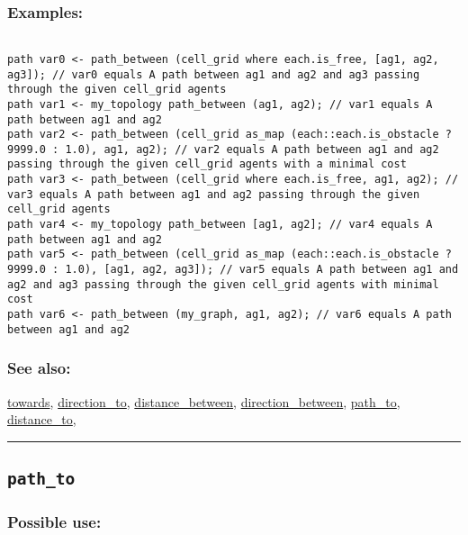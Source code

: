 \documentclass[]{book}
\theoremstyle{definition}
\theoremstyle{definition}
\theoremstyle{definition}
\theoremstyle{remark}
\begin{document}
\subsubsection{Examples:}\label{examples-271}

\begin{verbatim}
 
path var0 <- path_between (cell_grid where each.is_free, [ag1, ag2, ag3]); // var0 equals A path between ag1 and ag2 and ag3 passing through the given cell_grid agents 
path var1 <- my_topology path_between (ag1, ag2); // var1 equals A path between ag1 and ag2 
path var2 <- path_between (cell_grid as_map (each::each.is_obstacle ? 9999.0 : 1.0), ag1, ag2); // var2 equals A path between ag1 and ag2 passing through the given cell_grid agents with a minimal cost 
path var3 <- path_between (cell_grid where each.is_free, ag1, ag2); // var3 equals A path between ag1 and ag2 passing through the given cell_grid agents 
path var4 <- my_topology path_between [ag1, ag2]; // var4 equals A path between ag1 and ag2 
path var5 <- path_between (cell_grid as_map (each::each.is_obstacle ? 9999.0 : 1.0), [ag1, ag2, ag3]); // var5 equals A path between ag1 and ag2 and ag3 passing through the given cell_grid agents with minimal cost 
path var6 <- path_between (my_graph, ag1, ag2); // var6 equals A path between ag1 and ag2
\end{verbatim}

\subsubsection{See also:}\label{see-also-159}

\href{OperatorsSZ\#towards}{towards},
\href{OperatorsDH\#direction_to}{direction\_to},
\href{OperatorsDH\#distance_between}{distance\_between},
\href{OperatorsDH\#direction_between}{direction\_between},
\href{OperatorsNR\#path_to}{path\_to},
\href{OperatorsDH\#distance_to}{distance\_to},

\begin{center}\rule{0.5\linewidth}{\linethickness}\end{center}

\subsection{\texorpdfstring{\texttt{path\_to}}{path\_to}}\label{path_to}

\subsubsection{Possible use:}\label{possible-use-396}
\end{document}
